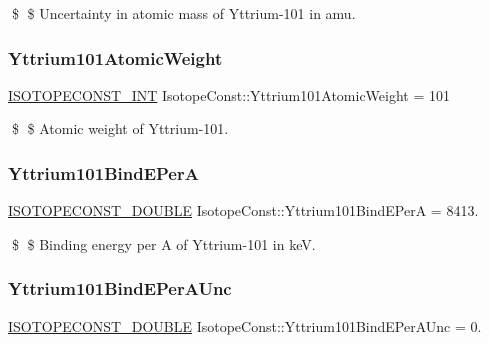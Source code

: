 \$ \$ Uncertainty in atomic mass of Yttrium-\/101 in amu. \mbox{\label{group___isotope_const-_yttrium-_y101_gac52fe3e6b3ef5cd3269e545bf56b795c}} 
\subsubsection{\texorpdfstring{Yttrium101\+Atomic\+Weight}{Yttrium101AtomicWeight}}
{\footnotesize\ttfamily \mbox{\hyperlink{group___isotope_const-_macros_ga5f18360b3e99483a35c32d789e62621c}{I\+S\+O\+T\+O\+P\+E\+C\+O\+N\+S\+T\+\_\+\+I\+NT}} Isotope\+Const\+::\+Yttrium101\+Atomic\+Weight = 101}

\$ \$ Atomic weight of Yttrium-\/101. \mbox{\label{group___isotope_const-_yttrium-_y101_ga5de4d07301a6f339e8e147c1169af683}} 
\subsubsection{\texorpdfstring{Yttrium101\+Bind\+E\+PerA}{Yttrium101BindEPerA}}
{\footnotesize\ttfamily \mbox{\hyperlink{group___isotope_const-_macros_ga8f45a7272ce02c0b4c65c44636ed719a}{I\+S\+O\+T\+O\+P\+E\+C\+O\+N\+S\+T\+\_\+\+D\+O\+U\+B\+LE}} Isotope\+Const\+::\+Yttrium101\+Bind\+E\+PerA = 8413.}

\$ \$ Binding energy per A of Yttrium-\/101 in keV. \mbox{\label{group___isotope_const-_yttrium-_y101_ga107e373a0005e093a3ae9d85c13c965f}} 
\subsubsection{\texorpdfstring{Yttrium101\+Bind\+E\+Per\+A\+Unc}{Yttrium101BindEPerAUnc}}
{\footnotesize\ttfamily \mbox{\hyperlink{group___isotope_const-_macros_ga8f45a7272ce02c0b4c65c44636ed719a}{I\+S\+O\+T\+O\+P\+E\+C\+O\+N\+S\+T\+\_\+\+D\+O\+U\+B\+LE}} Isotope\+Const\+::\+Yttrium101\+Bind\+E\+Per\+A\+Unc = 0.}

